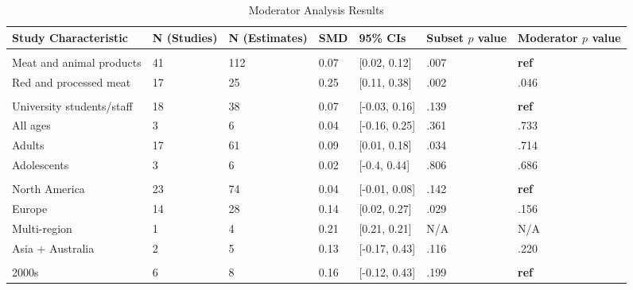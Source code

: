 \documentclass[preprint, 3p,
authoryear]{elsarticle} %
\begin{document}
\begin{table}[!ht]

\caption{\label{tab:table_S1}Moderator Analysis Results}
\begin{tabular}[t]{lllll>{\raggedright\arraybackslash}p{2 cm}>{\raggedright\arraybackslash}p{2 cm}}
\toprule
Study Characteristic & N (Studies) & N (Estimates) & SMD & 95\% CIs & Subset $p$ value & Moderator $p$ value\\
\midrule
\addlinespace[0.3em]
\multicolumn{7}{l}{\textbf{Outcome}}\\
\hspace{1em}Meat and animal products & 41 & 112 & 0.07 & {}[0.02, 0.12] & .007 & \textbf{ref}\\
\hspace{1em}Red and processed meat & 17 & 25 & 0.25 & {}[0.11, 0.38] & .002 & .046\\
\addlinespace[0.3em]
\multicolumn{7}{l}{\textbf{Population}}\\
\hspace{1em}University students/staff & 18 & 38 & 0.07 & {}[-0.03, 0.16] & .139 & \textbf{ref}\\
\hspace{1em}All ages & 3 & 6 & 0.04 & {}[-0.16, 0.25] & .361 & .733\\
\hspace{1em}Adults & 17 & 61 & 0.09 & {}[0.01, 0.18] & .034 & .714\\
\hspace{1em}Adolescents & 3 & 6 & 0.02 & {}[-0.4, 0.44] & .806 & .686\\
\addlinespace[0.3em]
\multicolumn{7}{l}{\textbf{Region}}\\
\hspace{1em}North America & 23 & 74 & 0.04 & {}[-0.01, 0.08] & .142 & \textbf{ref}\\
\hspace{1em}Europe & 14 & 28 & 0.14 & {}[0.02, 0.27] & .029 & .156\\
\hspace{1em}Multi-region & 1 & 4 & 0.21 & {}[0.21, 0.21] & N/A & N/A\\
\hspace{1em}Asia + Australia & 2 & 5 & 0.13 & {}[-0.17, 0.43] & .116 & .220\\
\addlinespace[0.3em]
\multicolumn{7}{l}{\textbf{Publication Decade}}\\
\hspace{1em}2000s & 6 & 8 & 0.16 & {}[-0.12, 0.43] & .199 & \textbf{ref}\\

\end{tabular}
\end{table}
\end{document}
